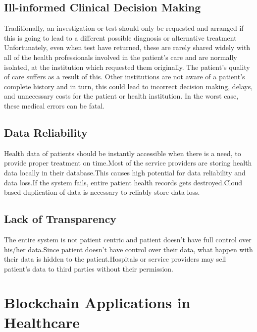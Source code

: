 \documentclass[12pt]{report}
\begin{document}
\section{Ill-informed Clinical Decision
Making\cite{3}}Traditionally, an investigation or test should only be requested and arranged if this is going
to lead to a different possible
diagnosis or alternative treatment Unfortunately, even when
test have returned, these are
rarely shared widely with all of
the health professionals involved
in the patient’s care and are
normally isolated, at the
institution which requested them
originally.
The patient’s quality of care
suffers as a result of this. Other
institutions are not aware of a
patient’s complete history and in
turn, this could lead to incorrect
decision making, delays, and
unnecessary costs for the patient
or health institution. In the worst
case, these medical errors can be
fatal.

\section{Data Reliability}
Health data of patients should be instantly accessible when there is a need, to provide proper treatment on time.Most of the service providers are storing health data locally in their database.This causes high potential for data reliability and data loss.If the system fails, entire patient health records gets destroyed.Cloud based duplication of data is necessary to reliably store data loss.

\section{Lack of Transparency}
The entire system is not patient centric and patient doesn't have full control over his/her data.Since patient doesn't have control over their data, what happen with their data is hidden to the patient.Hospitals or service providers may sell patient's data to third parties without their permission.

\chapter{Blockchain Applications in Healthcare}
\end{document}

